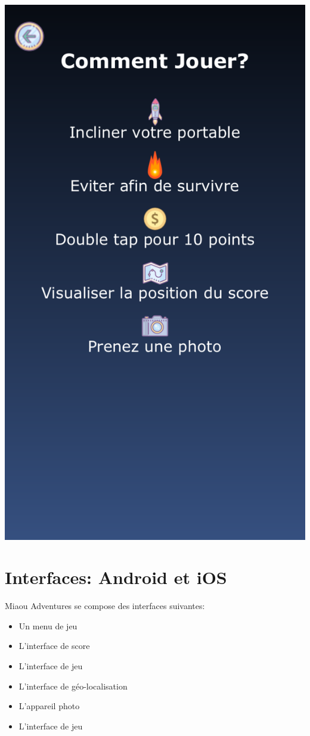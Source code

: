 \documentclass{article}
\begin{document}
\begin{center}
    \includegraphics[scale = 0.2]{images/iOS_fr.PNG}
\end{center}

\newpage
\section{Interfaces: Android et iOS}

Miaou Adventures se compose des interfaces suivantes:
\begin{multicols}{2}
\begin{itemize}
 \item Un menu de jeu
 \item L'interface de score
 \item L'interface de jeu
 \item L'interface de géo-localisation
 \item L'appareil photo
 \item L'interface de jeu
\end{itemize}
\end{multicols}
\end{document}
